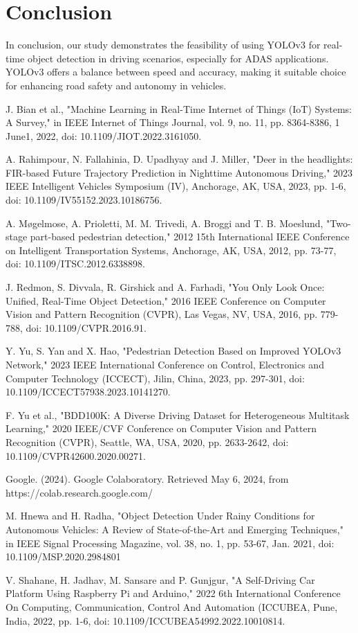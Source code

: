 \documentclass[conference]{IEEEtran}
\begin{document}
\section{Conclusion}
In conclusion, our study demonstrates the feasibility of using YOLOv3 for real-time object detection in driving 
scenarios, especially for ADAS applications. YOLOv3 offers a balance between speed and accuracy, making it suitable choice
for enhancing road safety and autonomy in vehicles. 
\begin{thebibliography}{00}
J. Bian et al., "Machine Learning in Real-Time Internet of Things (IoT) Systems: A Survey," in IEEE Internet of Things Journal, vol. 9, no. 11, pp. 8364-8386, 1 June1, 2022, doi: 10.1109/JIOT.2022.3161050.

A. Rahimpour, N. Fallahinia, D. Upadhyay and J. Miller, "Deer in the headlights: FIR-based Future Trajectory Prediction in Nighttime Autonomous Driving," 2023 IEEE Intelligent Vehicles Symposium (IV), Anchorage, AK, USA, 2023, pp. 1-6, doi: 10.1109/IV55152.2023.10186756.

A. Møgelmose, A. Prioletti, M. M. Trivedi, A. Broggi and T. B. Moeslund, "Two-stage part-based pedestrian detection," 2012 15th International IEEE Conference on Intelligent Transportation Systems, Anchorage, AK, USA, 2012, pp. 73-77, doi: 10.1109/ITSC.2012.6338898.

J. Redmon, S. Divvala, R. Girshick and A. Farhadi, "You Only Look Once: Unified, Real-Time Object Detection," 2016 IEEE Conference on Computer Vision and Pattern Recognition (CVPR), Las Vegas, NV, USA, 2016, pp. 779-788, doi: 10.1109/CVPR.2016.91.

Y. Yu, S. Yan and X. Hao, "Pedestrian Detection Based on Improved YOLOv3 Network," 2023 IEEE International Conference on Control, Electronics and Computer Technology (ICCECT), Jilin, China, 2023, pp. 297-301, doi: 10.1109/ICCECT57938.2023.10141270.

F. Yu et al., "BDD100K: A Diverse Driving Dataset for Heterogeneous Multitask Learning," 2020 IEEE/CVF Conference on Computer Vision and Pattern Recognition (CVPR), Seattle, WA, USA, 2020, pp. 2633-2642, doi: 10.1109/CVPR42600.2020.00271.

Google. (2024). Google Colaboratory. Retrieved May 6, 2024, from https://colab.research.google.com/

M. Hnewa and H. Radha, "Object Detection Under Rainy Conditions for Autonomous Vehicles: A Review of State-of-the-Art and Emerging Techniques," in IEEE Signal Processing Magazine, vol. 38, no. 1, pp. 53-67, Jan. 2021, doi: 10.1109/MSP.2020.2984801

V. Shahane, H. Jadhav, M. Sansare and P. Gunjgur, "A Self-Driving Car Platform Using Raspberry Pi and Arduino," 2022 6th International Conference On Computing, Communication, Control And Automation (ICCUBEA, Pune, India, 2022, pp. 1-6, doi: 10.1109/ICCUBEA54992.2022.10010814.

\end{thebibliography}
\end{document}
